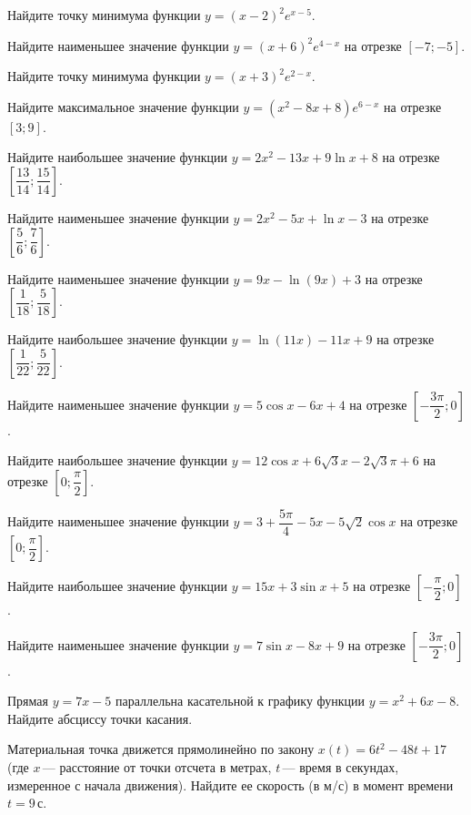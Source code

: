 \begin{class}[number=2]
	\begin{listofex}
		\item Найдите точку минимума функции \( y=(x-2)^2 e^{ x-5} \).
		\item Найдите наименьшее значение функции \( y=(x+6)^2 e^{4-x} \) на отрезке \([-7;-5]\).
		\item Найдите точку минимума функции \( y=(x+3)^2e^{2-x} \).
		\item Найдите максимальное значение функции \(y=(x^2-8x+8)e^{6-x}\) на отрезке \([3;9]\).
		\item Найдите наибольшее значение функции \( y=2x^2-13x+9\ln x + 8 \) на отрезке \(\left[ \dfrac{ 13 }{ 14 }; \dfrac{15  }{14  } \right] \).
		\item Найдите наименьшее значение функции \( y=2x^2-5x+\ln x-3 \) на отрезке \(\left[ \dfrac{ 5 }{ 6 }; \dfrac{ 7 }{ 6 } \right] \).
		\item Найдите наименьшее значение функции \( y=9x-\ln(9x)+3 \) на отрезке \(\left[ \dfrac{1  }{ 18 }; \dfrac{ 5 }{ 18 } \right] \).
		\item Найдите наибольшее значение функции \( y=\ln(11x)-11x+9 \) на отрезке \(\left[ \dfrac{ 1 }{ 22}; \dfrac{ 5 }{ 22 } \right] \).
		\item Найдите наименьшее значение функции \(y=5 \cos x - 6x + 4 \) на отрезке \( \left[ -\dfrac{ 3\pi }{ 2 }; 0 \right] \).
		\item Найдите наибольшее значение функции \(y=12\cos x + 6\sqrt{3}x - 2 \sqrt{3} \pi +6 \) на отрезке \( \left[ 0; \dfrac{ \pi }{ 2 } \right] \).
		\item Найдите наименьшее значение функции \(y=3+\dfrac{ 5\pi }{ 4 } -5x - 5\sqrt{2} \cos x \) на отрезке \( \left[ 0; \dfrac{ \pi }{ 2 } \right] \).
		\item Найдите наибольшее значение функции \(y=15 x + 3\sin x + 5 \) на отрезке \( \left[ -\dfrac{ \pi }{ 2 }; 0 \right] \).
		\item Найдите наименьшее значение функции \(y=7\sin x -8x+9 \) на отрезке \( \left[ -\dfrac{ 3\pi }{ 2 }; 0 \right] \).
		\item Прямая \(y=7x-5\) параллельна касательной к графику функции \(y=x^2+6x-8\). Найдите абсциссу точки касания.
		\item Материальная точка движется прямолинейно по закону \(x(t)=6t^2-48t+17\) (где \(x\) --- расстояние от точки отсчета в метрах, \(t\) --- время в секундах, измеренное с начала движения). Найдите ее скорость (в м/с) в момент времени \(t  =  9\) с.

\end{listofex}
\end{class}
